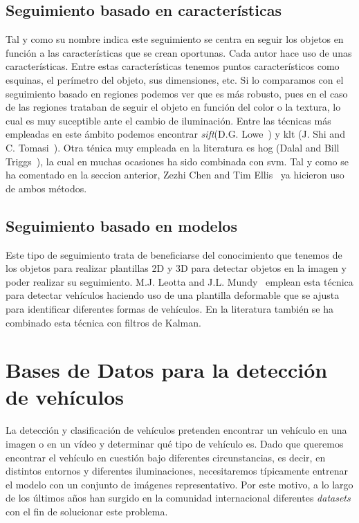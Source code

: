 \subsection{Seguimiento basado en características}

Tal y como su nombre indica este seguimiento se centra en seguir los objetos en función a las características que se crean oportunas. Cada autor hace uso de unas características. Entre estas características tenemos puntos característicos como esquinas, el perímetro del objeto, sus dimensiones, etc. Si lo comparamos con el seguimiento basado en regiones podemos ver que es más robusto, pues en el caso de las regiones trataban de seguir el objeto en función del color o la textura, lo cual es muy suceptible ante el cambio de iluminación. Entre las técnicas más empleadas en este ámbito podemos encontrar \textit{\acrfull{sift}}(D.G. Lowe~\cite{article_sift}) y \acrfull{klt} (J. Shi and C. Tomasi~\cite{article_klt}). Otra ténica muy empleada en la literatura es \acrshort{hog} (Dalal and Bill Triggs~\cite{hog_paper}), la cual en muchas ocasiones ha sido combinada con \acrshort{svm}. Tal y como se ha comentado en la seccion anterior, Zezhi Chen and Tim Ellis~\cite{multi_shape_descriptor} ya hicieron uso de ambos métodos.

\subsection{Seguimiento basado en modelos}

Este tipo de seguimiento trata de beneficiarse del conocimiento que tenemos de los objetos para realizar plantillas 2D y 3D para detectar objetos en la imagen y poder realizar su seguimiento. M.J. Leotta and J.L. Mundy~\cite{vehicle_surveillance_3d} emplean esta técnica para detectar vehículos haciendo uso de una plantilla deformable que se ajusta para identificar diferentes formas de vehículos. En la literatura también se ha combinado esta técnica con filtros de Kalman. 




\section{Bases de Datos para la detección de vehículos}
\label{sec:dataset}

La detección y clasificación de vehículos pretenden encontrar un vehículo en una imagen o en un vídeo y determinar qué tipo de vehículo es. Dado que queremos encontrar el vehículo en cuestión bajo diferentes circunstancias, es decir, en distintos entornos y diferentes iluminaciones, necesitaremos típicamente entrenar el modelo con un conjunto de imágenes representativo. Por este motivo, a lo largo de los últimos años han surgido en la comunidad internacional diferentes \textit{datasets} con el fin de solucionar este problema.

